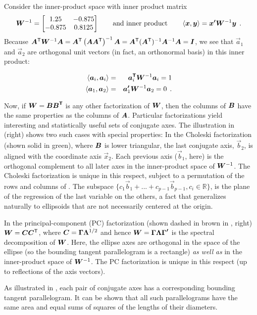 Consider the inner-product space with inner product matrix 	
\begin{equation*}
\bm{W}^{-1}=\left[ \begin{matrix}	
1.25 & -0.875 \\	
-0.875 & 0.8125 \\	
\end{matrix} \right]
\quad\quad\mbox{and inner product}\quad\quad
\left\langle \bm{x},\bm{y} \right\rangle =\bm{{x}'W}^{-1}\bm{y} \:\: .
\end{equation*} 	
Because	
$\bm{A}^\mathsf{T} \bm{W}^{-1}\bm{A}
=\bm{A}^\mathsf{T}\left( \bm{A}\bm{A}^\mathsf{T} \right)^{-1}\bm{A}
=\bm{A}^\mathsf{T}(\bm{A}^\mathsf{T})^{-1}\bm{A}^{-1}\bm{A}
=\bm{I}
$,
we see that
$\vec{a}_{1}$
and	
$\vec{a}_{2}$	
are orthogonal unit vectors (in fact, an orthonormal basis) in this inner product:	

\begin{eqnarray*}
\left\langle \vec{a}_{i},\vec{a}_{i} \right\rangle & = & \vec{{a}\trans}_{i}\mat{W}^{-1}\vec{a}_{i}=1	 \\
%	
\left\langle \vec{a}_{1},\vec{a}_{2} \right\rangle & = &\vec{{a}'}_{1}\mat{W}^{-1}\vec{a}_{2}=0 \period
\end{eqnarray*}


Now, if $\bm{W}=\bm{B{B}^\mathsf{T}}$ is any other factorization of
$\bm{W}$,
then the columns of
$\bm{B}$
have the same properties as the columns of
$\bm{A}$.
Particular factorizations yield interesting and statistically useful sets of conjugate axes.
The illustration in  (right) shows two such cases with special properties:
In the Choleski factorization (shown solid in green), where
$\bm{B}$ is lower triangular, the last conjugate axis, $\vec{b}_2$, is aligned with the coordinate
axis $\vec{x}_2$.  Each previous axis ($\vec{b}_1$, here) is the orthogonal complement to
all later axes in the  inner-product space of
$\bm{W}^{-1}$.  
The Choleski factorization is unique in this respect, subject to a
permutation of the rows and columns of . 
The subspace $\{ c_1 \vec{b}_1 + ... + c_{p-1} \vec{b}_{p-1}  , c_i \in \mathbb{R}\}$, is the plane of the regression of the last variable on the others, 
a fact that generalizes naturally to 
ellipsoids that are not necessarily centered at the origin.  %

In the principal-component (PC) factorization (shown dashed in brown in , right) $\bm{W}=\bm{C} \bm{C}^\mathsf{T}$, where
$\bm{C}=\bm{\Gamma \Lambda }^{1/2}$
and hence
$\bm{W}=\bm{\Gamma \Lambda {\Gamma }'}$
is the spectral decomposition of
$\bm{W}$. Here, the ellipse axes are orthogonal in the space of the ellipse
(so the bounding tangent parallelogram is a rectangle) \emph{as well as} in the inner-product space of
$\bm{W}^{-1}$. The PC factorization is unique in this respect (up to reflections of the axis vectors).

As illustrated in , each pair of conjugate axes has a corresponding bounding tangent
parallelogram. It can be shown that all such parallelograms have the same area
and equal sums of squares of the lengths of their diameters.
